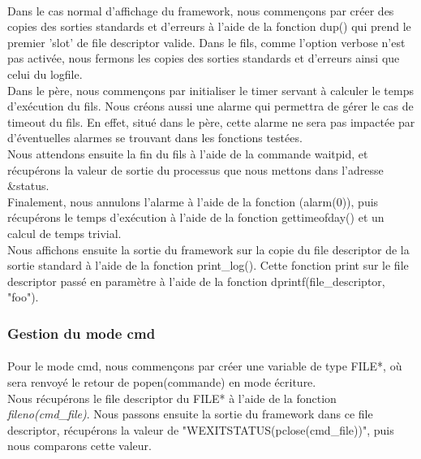 \documentclass[12pt]{article}
\begin{document}
\paragraph{}
Dans le cas normal d'affichage du framework, nous commençons par créer des copies des sorties standards et d'erreurs à l'aide de la fonction dup() qui prend le premier 'slot' de file descriptor valide. Dans le fils, comme l'option verbose n'est pas activée, nous fermons les copies des sorties standards et d'erreurs ainsi que celui du logfile.\\

Dans le père, nous commençons par initialiser le timer servant à calculer le temps d'exécution du fils. Nous créons aussi une alarme qui permettra de gérer le cas de timeout du fils. En effet, situé dans le père, cette alarme ne sera pas impactée par d'éventuelles alarmes se trouvant dans les fonctions testées.\\

Nous attendons ensuite la fin du fils à l'aide de la commande waitpid, et récupérons la valeur de sortie du processus que nous mettons dans l'adresse \&status.\\
Finalement, nous annulons l'alarme à l'aide de la fonction (alarm(0)), puis récupérons le temps d'exécution à l'aide de la fonction gettimeofday() et un calcul de temps trivial.\\

Nous affichons ensuite la sortie du framework sur la copie du file descriptor de la sortie standard à l'aide de la fonction print\_log().
Cette fonction print sur le file descriptor passé en paramètre à l'aide de la fonction dprintf(file\_descriptor, "foo").\\


\newpage

\subsubsection{Gestion du mode cmd}
\paragraph{}
Pour le mode cmd, nous commençons par créer une variable de type FILE*, où sera renvoyé le retour de popen(commande) en mode écriture.\\

Nous récupérons le file descriptor du FILE* à l'aide de la fonction \textit{fileno(cmd\_file)}. Nous passons ensuite la sortie du framework dans ce file descriptor, récupérons la valeur de "WEXITSTATUS(pclose(cmd\_file))", puis nous comparons cette valeur.\\
\end{document}
